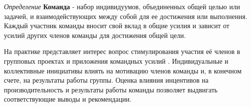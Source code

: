 \textit{Определение} \textbf{Команда} - набор индивидуумов, объединенных общей целью или задачей, и взаимодействующих между собой для ее достижения или выполнения. Каждый участник команды вносит свой вклад в общие усилия и зависит от усилий других членов команды для достижения общей цели.

На практике представляет интерес вопрос стимулирования участия её членов в групповых проектах и приложения командных усилий \cite{groves1973incentives}. 
Индивидуальные и коллективные инициативы влиять на мотивацию членов команды и, в конечном счете, на результаты работы группы. Оценка влияния инцентивов на производительность и результаты работы команды позволяет выдвигать соответствующие выводы и рекомендации.


